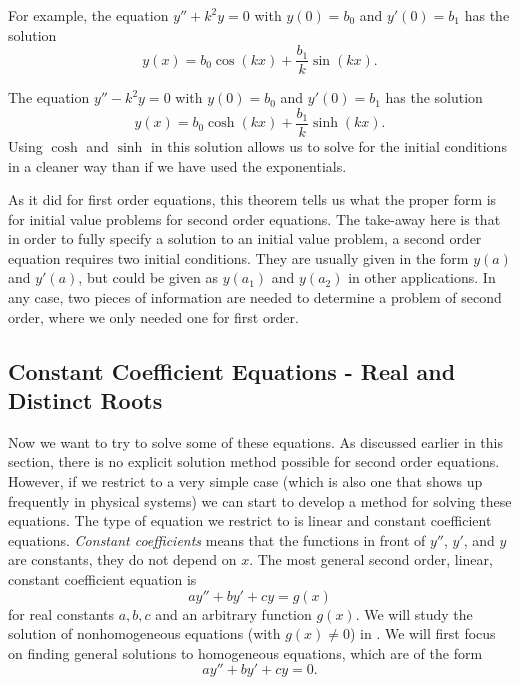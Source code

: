 \documentclass{ximera}
\begin{document}
For example, the equation $y'' + k^2 y = 0$ with $y(0) = b_0$ and $y'(0) = b_1$ has the solution
\begin{equation*}
    y(x) = b_0 \cos (kx) + \frac{b_1}{k} \sin (kx) .
\end{equation*}

The equation $y'' - k^2 y = 0$ with $y(0) = b_0$ and $y'(0) = b_1$ has the solution
\begin{equation*}
    y(x) = b_0 \cosh (kx) + \frac{b_1}{k} \sinh (kx) .
\end{equation*}
Using $\cosh$ and $\sinh$ in this solution allows us to solve for the initial conditions in a cleaner way than if we have used the exponentials.

As it did for first order equations, this theorem tells us what the proper form is for initial value problems for second order equations. The take-away here is that in order to fully specify a solution to an initial value problem, a second order equation requires two initial conditions. They are usually given in the form $y(a)$ and $y'(a)$, but could be given as $y(a_1)$ and $y(a_2)$ in other applications. In any case, two pieces of information are needed to determine a problem of second order, where we only needed one for first order. 

\subsection{Constant Coefficient Equations - Real and Distinct Roots}

Now we want to try to solve some of these equations. As discussed earlier in this section, there is no explicit solution method possible for second order equations. However, if we restrict to a very simple case (which is also one that shows up frequently in physical systems) we can start to develop a method for solving these equations. The type of equation we restrict to is linear and constant coefficient equations.  \emph{Constant coefficients} means that the functions in front of $y''$, $y'$, and $y$ are constants, they do not depend on $x$. The most general second order, linear, constant coefficient equation is
\begin{equation*}
    ay'' + by' + cy = g(x)
\end{equation*}
for real constants $a, b, c$ and an arbitrary function $g(x)$. We will study the solution of nonhomogeneous equations (with $g(x) \neq 0$) in .  We will first focus on finding general solutions to homogeneous equations, which are of the form
\begin{equation*}
    ay'' + by' + cy = 0.
\end{equation*}
\end{document}
